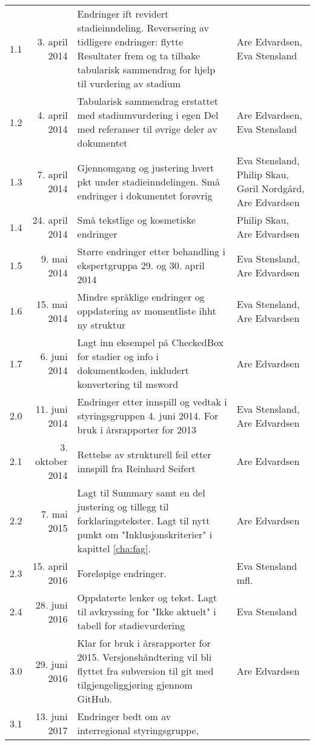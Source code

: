 \documentclass[norsk, a4paper, twocolumn]{report}
\begin{document}
\begin{longtable}{lrp{8cm}p{2.5cm}}
    1.1 & 3. april 2014 & Endringer ift revidert stadieinndeling. Reversering
    av tidligere endringer: flytte Resultater frem og ta tilbake
    tabularisk sammendrag for hjelp til vurdering av stadium & Are Edvardsen,
    Eva Stensland \\
    1.2 & 4. april 2014 & Tabularisk sammendrag erstattet med stadiumvurdering
    i egen Del med referanser til øvrige deler av dokumentet & Are Edvardsen,
    Eva Stensland \\
    1.3 & 7. april 2014 & Gjennomgang og justering hvert pkt under
    stadieinndelingen. Små endringer i dokumentet forøvrig &
    Eva Stensland, Philip Skau, Gøril Nordgård, Are Edvardsen \\
    1.4 & 24. april 2014 & Små tekstlige og kosmetiske endringer &
    Philip Skau, Are Edvardsen \\
    1.5 & 9. mai 2014 & Større endringer etter behandling i ekspertgruppa
    29. og 30. april 2014 & Eva Stensland, Are Edvardsen \\
    1.6 & 15. mai 2014 & Mindre språklige endringer og oppdatering av
    momentliste ihht ny struktur & Eva Stensland, Are Edvardsen \\
    1.7 & 6. juni 2014 & Lagt inn eksempel på CheckedBox for stadier og info
    i dokumentkoden, inkludert konvertering til msword & Are Edvardsen \\
    2.0 & 11. juni 2014 & Endringer etter innspill og vedtak i styringsgruppen
    4. juni 2014. For bruk i årsrapporter for 2013 & Eva Stensland,
    Are Edvardsen \\
    2.1 & 3. oktober 2014 & Rettelse av strukturell feil etter innspill fra
    Reinhard Seifert & Are Edvardsen \\
    2.2 & 7. mai 2015 & Lagt til Summary samt en del justering og tillegg
    til forklaringstekster. Lagt til nytt punkt om "Inklusjonskriterier" i
    kapittel \ref{cha:fag}. & Are Edvardsen \\
    2.3 & 15. april 2016 & Foreløpige endringer. & Eva Stensland mfl. \\
    2.4 & 28. juni 2016 & Oppdaterte lenker og tekst. Lagt til avkryssing
    for "Ikke aktuelt" i tabell for stadievurdering & Eva Stensland \\
    3.0 & 29. juni 2016 & Klar for bruk i årsrapporter for 2015.
    Versjonshåndtering vil bli flyttet fra subversion til git med 
    tilgjengeliggjøring gjennom GitHub. & Are Edvardsen \\
    3.1 & 13. juni 2017 & Endringer bedt om av interregional styringsgruppe,

\end{longtable}
\end{document}
